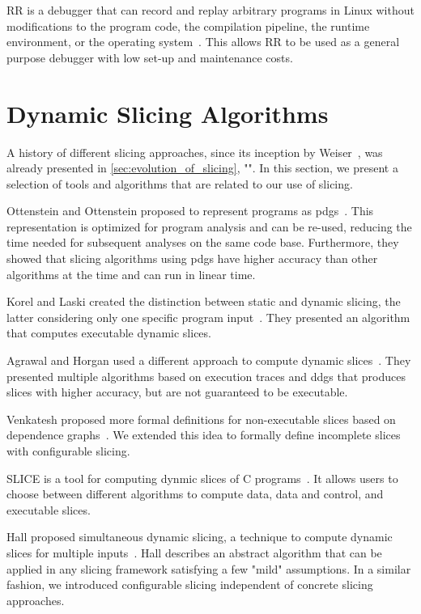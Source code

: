 RR is a debugger that can record and replay arbitrary programs in Linux without modifications to the program code, the compilation pipeline, the runtime environment, or the operating system~\cite{ocallahan17:engineering_record_and_replay}.
This allows RR to be used as a general purpose debugger with low set-up and maintenance costs.

\section{Dynamic Slicing Algorithms}
\label{sec:rw_dynamic_slicing}

A history of different slicing approaches, since its inception by Weiser~\cite{weiser81:program_slicing}, was already presented in \cref{sec:evolution_of_slicing}, "".
In this section, we present a selection of tools and algorithms that are related to our use of slicing.

Ottenstein and Ottenstein proposed to represent programs as \acfp{pdg}~\cite{ottenstein84:the_program_dependence_graph}.
This representation is optimized for program analysis and can be re-used, reducing the time needed for subsequent analyses on the same code base.
Furthermore, they showed that slicing algorithms using \acp{pdg} have higher accuracy than other algorithms at the time and can run in linear time.

Korel and Laski created the distinction between static and dynamic slicing, the latter considering only one specific program input~\cite{korel88:dynamic_program_slicing}.
They presented an algorithm that computes executable dynamic slices.

Agrawal and Horgan used a different approach to compute dynamic slices~\cite{agrawal90:dynamic_program_slicing}.
They presented multiple algorithms based on execution traces and \acfp{ddg} that produces slices with higher accuracy, but are not guaranteed to be executable.

Venkatesh proposed more formal definitions for non-executable slices based on dependence graphs~\cite{venkatesh91:the_semantic_approach}.
We extended this idea to formally define incomplete slices with configurable slicing.

SLICE is a tool for computing dynmic slices of C programs~\cite{venkatesh95:experimental_results_from_dynamic}.
It allows users to choose between different algorithms to compute data, data and control, and executable slices.

Hall proposed simultaneous dynamic slicing, a technique to compute dynamic slices for multiple inputs~\cite{hall95:automatic_extraction_of_executable}.
Hall describes an abstract algorithm that can be applied in any slicing framework satisfying a few "mild" assumptions.
In a similar fashion, we introduced configurable slicing independent of concrete slicing approaches.

